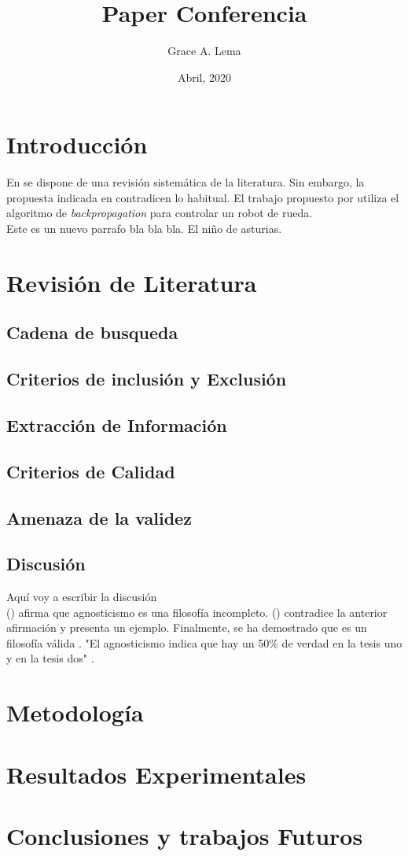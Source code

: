 \documentclass[12pt]{article} %
\title{Paper        Conferencia}
\author{Grace A. Lema }
\date{Abril, 2020}
\begin{document}
\maketitle

\section{Introducción}
En \cite{nogueira2017image} se dispone de una revisión sistemática de la literatura. Sin embargo, la propuesta indicada en \cite{dawkins_biology_2016} contradicen lo habitual. El trabajo propuesto por \cite{priandana2018backprop} utiliza el algoritmo de \textit{backpropagation} para controlar un robot de rueda.\\
Este es un nuevo parrafo bla bla bla. El niño de asturias.
\vspace{1.5cm}

\lipsum[2-4]

\section{Revisión de Literatura}
\subsection{Cadena de busqueda}
\lipsum[1-4]
\subsection{Criterios de inclusión y Exclusión}
\lipsum[1-4]
\subsection{Extracción de Información}
\subsection{Criterios de Calidad}
\lipsum[1-4]
\subsection{Amenaza de la validez}
\lipsum[1-4]
\subsection{Discusión}
Aquí voy a escribir la discusión \\
\citeauthor{dawkins_biology_2016} (\citeyear{dawkins_biology_2016}) afirma que agnosticismo es una filosofía incompleto. \citeauthor{nogueira2017image} (\citeyear{nogueira2017image}) contradice la anterior afirmación y presenta un ejemplo. Finalmente, se ha demostrado que es un filosofía válida \parencite[ver pag 92]{priandana2018backprop}. "El agnosticismo indica que hay un 50\% de verdad en la tesis uno y en la tesis dos" \textcite{nogueira2017image}.

\section{Metodología}
\lipsum[1-4]
\section{Resultados Experimentales}
\lipsum[1-4]
\section{Conclusiones y trabajos Futuros}
\lipsum[1-4]
\printbibliography[title={Bibliografía}]
\end{document}
